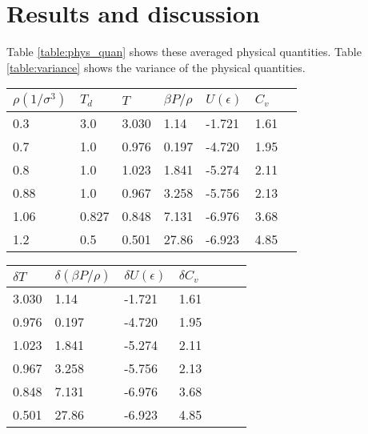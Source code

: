 \section{Results and discussion}



Table \ref{table:phys_quan} shows these averaged physical quantities. Table \ref{table:variance} shows the variance of the physical quantities.
\begin{center}
\begin{tabular}{lllllll}
\hline \hline
$\rho(1/\sigma^3)$ & $T_d$ & $T$ & $\beta P/\rho$ & $U(\epsilon)$ & $C_v$ \\
\hline
0.3 & 3.0 & 3.030 & 1.14 & -1.721 & 1.61 \\
0.7 & 1.0 & 0.976 & 0.197 & -4.720 & 1.95 \\
0.8 & 1.0 & 1.023 & 1.841 & -5.274 & 2.11 \\
0.88& 1.0 & 0.967 & 3.258 & -5.756 & 2.13 \\
1.06& 0.827&0.848 & 7.131 & -6.976 & 3.68 \\
1.2 & 0.5 & 0.501 & 27.86 & -6.923 & 4.85 \\
\hline \hline
\end{tabular}
\vspace{-0.1cm}
\label{table:phys_quan}
\end{center}

\begin{center}
\begin{tabular}{lllllll}
\hline \hline
 $\delta T$ & $\delta (\beta P/\rho)$ & $\delta U(\epsilon)$ & $\delta C_v$ \\
\hline
 3.030 & 1.14 & -1.721 & 1.61 \\
 0.976 & 0.197 & -4.720 & 1.95 \\
 1.023 & 1.841 & -5.274 & 2.11 \\
 0.967 & 3.258 & -5.756 & 2.13 \\
 0.848 & 7.131 & -6.976 & 3.68 \\
 0.501 & 27.86 & -6.923 & 4.85 \\
\hline \hline
\end{tabular}
\vspace{-0.1cm}
\label{table:variance}
\end{center}